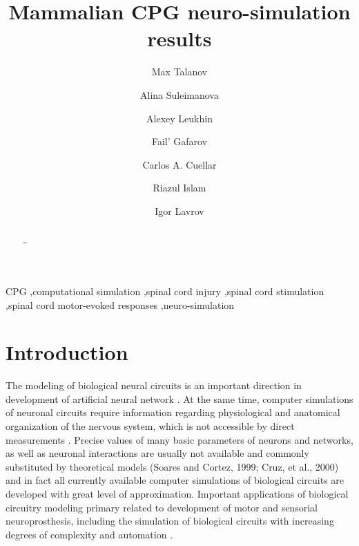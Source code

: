 \documentclass[]{elsarticle}
\title{Mammalian CPG neuro-simulation results}
\begin{document}
\begin{frontmatter}

\author[inst1]{Max Talanov}
\author[inst1]{Alina Suleimanova}
\author[inst1]{Alexey Leukhin}
\author[inst1]{Fail' Gafarov}
\author[inst2]{Carlos A. Cuellar}
\author[inst2]{Riazul Islam}
\author[inst1,inst2,inst3,inst4,*]{Igor Lavrov}

\address[inst1]{Kazan Federal University, Kazan Russia.}
\address[inst2]{Department of Neurologic Surgery, Mayo Clinic, Rochester, MN, USA.}
\address[inst3]{Department of Physiology and Biomedical Engineering, Mayo Clinic, Rochester, MN, USA}
\address[inst4]{Department of Neurology, Mayo Clinic, Rochester, MN, USA}
\address[*]{Corresponding author}

\begin{abstract}

\ldots

\end{abstract}

\begin{keyword}
CPG \sep computational simulation \sep spinal cord injury \sep spinal cord stimulation \sep spinal cord motor-evoked responses \sep neuro-simulation
\end{keyword}
\end{frontmatter}


\section{Introduction}

The modeling of biological neural circuits is an important direction in development  of artificial neural network \cite{bekka2002use}.  
At the same time, computer simulations of neuronal circuits require information regarding physiological and anatomical organization of the nervous system, which is not accessible by direct measurements \cite{prentice2001artificial}. Precise values of many basic parameters of neurons and networks, as well as neuronal interactions are usually not available and commonly substituted by theoretical models (Soares and Cortez, 1999; Cruz, et al., 2000) \cite{bizzi1991computations} and in fact all currently available computer simulations of biological circuits are developed with great level of approximation. Important applications of biological circuitry modeling primary related to development of motor and sensorial neuroprosthesis, including the simulation of biological circuits with increasing degrees of complexity and automation \cite{donaldson1997neuroprostheses,lauer1999eeg}. 
\end{document}
